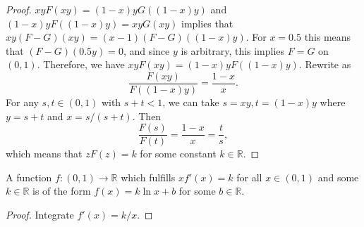 \documentclass[12pt]{article}
\begin{document}
\begin{proof}
  \label{prf:aelailag}
  $xyF(xy)=(1-x)yG((1-x)y)$ and $(1-x)yF((1-x)y)=xyG(xy)$ implies that
  $xy(F-G)(xy)=(x-1)(F-G)((1-x)y)$. For $x=0.5$ this means that
  $(F-G)(0.5y)=0$, and since $y$ is arbitrary, this implies $F=G$ on
  $(0,1)$. Therefore, we have $xyF(xy)=(1-x)yF((1-x)y)$. Rewrite as
  \begin{equation}
    \label{eq:auleorua}
    \frac{F(xy)}{F((1-x)y)}=\frac{1-x}{x}.
  \end{equation}
  For any $s,t\in(0,1)$ with $s+t<1$, we can take $s=xy,t=(1-x)y$
  where $y=s+t$ and $x=s/(s+t)$. Then
  \begin{equation}
    \label{eq:feipaech}
    \frac{F(s)}{F(t)}=\frac{1-x}{x}=\frac{t}{s},
  \end{equation}
  which means that $zF(z)=k$ for some constant $k\in\mathbb{R}$.
\end{proof}

\begin{lemma}
  \label{lma:fahgaich}
  A function $f:(0,1)\rightarrow\mathbb{R}$ which fulfills $xf'(x)=k$
  for all $x\in(0,1)$ and some $k\in\mathbb{R}$ is of the form
  $f(x)=k\ln{}x+b$ for some $b\in\mathbb{R}$.
\end{lemma}

\begin{proof}
  \label{prf:ahqueafe}
  Integrate $f'(x)=k/x$.
\end{proof}
\end{document}
